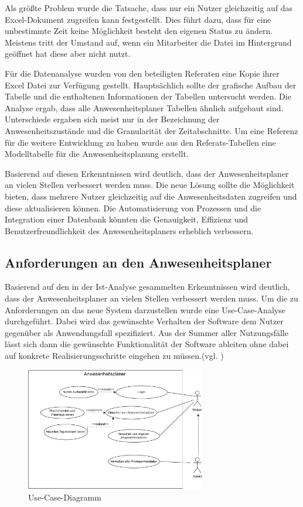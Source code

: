 Als größte Problem wurde die Tatsache, dass nur ein Nutzer gleichzeitig auf das Excel-Dokument zugreifen kann festgestellt. Dies führt dazu, dass für eine unbestimmte Zeit keine Möglichkeit besteht den eigenen Status zu ändern. Meistens tritt der Umstand auf, wenn ein Mitarbeiter die Datei im Hintergrund geöffnet hat diese aber nicht nutzt.

Für die Datenanalyse wurden von den beteiligten Referaten eine Kopie ihrer Excel Datei zur Verfügung gestellt. Hauptsächlich sollte der grafische Aufbau der Tabelle und die enthaltenen Informationen der Tabellen untersucht werden. Die Analyse ergab, dass alle Anwesenheitsplaner Tabellen ähnlich aufgebaut sind. Unterschiede ergaben sich meist nur in der Bezeichnung der Anwesenheitszustände und die Granularität der Zeitabschnitte. Um eine Referenz für die weitere Entwicklung zu haben wurde aus den Referats-Tabellen eine Modelltabelle für die Anwesenheitsplanung erstellt.

Basierend auf diesen Erkenntnissen wird deutlich, dass der Anwesenheitsplaner an vielen Stellen verbessert werden muss. Die neue Lösung sollte die Möglichkeit bieten, dass mehrere Nutzer gleichzeitig auf die Anwesenheitsdaten zugreifen und diese aktualisieren können. Die Automatisierung von Prozessen und die Integration einer Datenbank könnten die Genauigkeit, Effizienz und Benutzerfreundlichkeit des Anwesenheitsplaners erheblich verbessern.

\subsection{Anforderungen an den Anwesenheitsplaner}
\label{sec:Soll-Zustand}
Basierend auf den in der Ist-Analyse gesammelten Erkenntnissen wird deutlich, dass der Anwesenheitsplaner an vielen Stellen verbessert werden muss. Um die zu Anforderungen an das neue System darzustellen wurde eine Use-Case-Analyse durchgeführt. Dabei wird das gewünschte Verhalten der Software dem Nutzer gegenüber als Anwendungsfall spezifiziert. Aus der Summer aller Nutzungsfälle lässt sich dann die gewünschte Funktionalität der Software ableiten ohne dabei auf konkrete Realisierungsschritte eingehen zu müssen.(vgl. \cite[S. 164]{neumann-2002})

\begin{figure}[htb]
    \centering
    \includegraphics[width=0.7\textwidth,angle=0]{abb/use-case-diagramm.pdf}
    \caption[Beschreibung]{Use-Case-Diagramm}
    \label{fig:Use-Case-Diagramm}
\end{figure}

